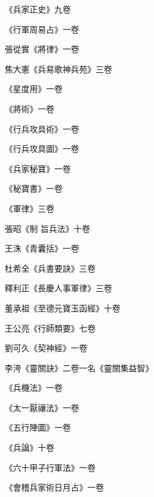 \begin{pinyinscope}
 《兵家正史》九卷



 《行軍周易占》一卷



 張從實《將律》一卷



 焦大憲《兵易歌神兵苑》三卷



 《星度用》一卷



 《將術》一卷



 《行兵攻具術》一卷



 《行兵攻具圖》一卷



 《兵家秘寶》一卷



 《秘寶書》一卷



 《軍律》三卷



 張昭《制
 旨兵法》十卷



 王洙《青囊括》一卷



 杜希全《兵書要訣》三卷



 釋利正《長慶人事軍律》三卷



 董承祖《至德元寶玉函經》十卷



 王公亮《行師類要》七卷



 劉可久《契神經》一卷



 李洿《靈關訣》二卷一名《靈關集益智》



 《兵機法》一卷



 《太一厭禳法》一卷



 《五行陣圖》一卷



 《兵論》十卷



 《六十甲子行軍法》一卷



 《會稽兵家術日月占》一卷




\end{pinyinscope}
